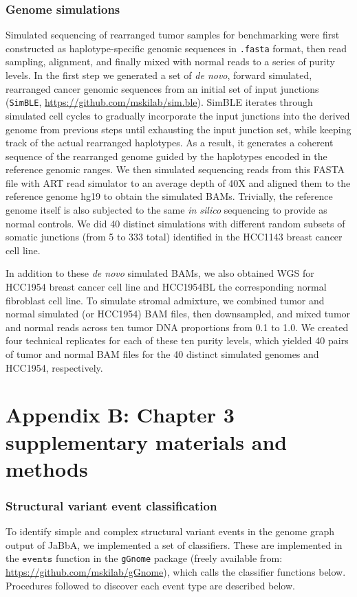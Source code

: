 \documentclass[phd,tocprelim]{cornell}
\newcommand{\ttt}[1]{\texttt{#1}}
\begin{document}
\subsection*{Genome simulations}
Simulated sequencing of rearranged tumor samples for benchmarking were first constructed as haplotype-specific genomic sequences in \ttt{.fasta} format, then read sampling, alignment, and finally mixed with normal reads to a series of purity levels. In the first step we generated a set of \textit{de novo}, forward simulated, rearranged cancer genomic sequences from an initial set of input junctions (\texttt{SimBLE}, \url{https://github.com/mskilab/sim.ble}). SimBLE iterates through simulated cell cycles to gradually incorporate the input junctions into the derived genome from previous steps until exhausting the input junction set, while keeping track of the actual rearranged haplotypes. As a result, it generates a coherent sequence of the rearranged genome guided by the haplotypes encoded in the reference genomic ranges. We then simulated sequencing reads from this FASTA file with ART read simulator \cite{Huang2012-zn} to an average depth of 40X and aligned them to the reference genome hg19 to obtain the simulated BAMs. Trivially, the reference genome itself is also subjected to the same \textit{in silico} sequencing to provide as normal controls. We did 40 distinct simulations with different random subsets of somatic junctions (from 5 to 333 total) identified in the HCC1143 breast cancer cell line. 

In addition to these \textit{de novo} simulated BAMs, we also obtained WGS for HCC1954 breast cancer cell line and HCC1954BL the corresponding normal fibroblast cell line.  To simulate stromal admixture, we combined tumor and normal simulated (or HCC1954) BAM files, then downsampled, and mixed tumor and normal reads across ten tumor DNA proportions from 0.1 to 1.0. We created four technical replicates for each of these ten purity levels, which yielded 40 pairs of tumor and normal BAM files for the 40 distinct simulated genomes and HCC1954, respectively.

\chapter*{Appendix B: Chapter 3 supplementary materials and methods} \label{app:b}

\subsection*{Structural variant event classification}
To identify simple and complex structural variant events in the genome graph output of JaBbA, we implemented a set of classifiers.  These are implemented in the $\ttt{events}$ function in the \texttt{gGnome} package (freely available from: \url{https://github.com/mskilab/gGnome}), which calls the classifier functions below. Procedures followed to discover each event type are described below.
\end{document}
